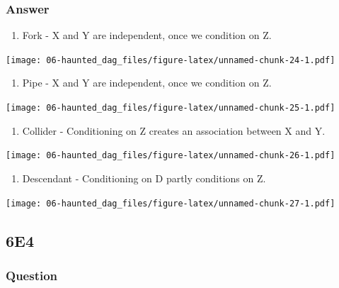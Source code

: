 \documentclass[
]{book}
\providecommand{\tightlist}{%
  \setlength{\itemsep}{0pt}\setlength{\parskip}{0pt}}
\begin{document}
\hypertarget{answer-50}{%
\subsubsection*{Answer}\label{answer-50}}

\begin{enumerate}
\def\labelenumi{\arabic{enumi}.}
\tightlist
\item
  Fork - X and Y are independent, once we condition on Z.
\end{enumerate}

\texttt{[image: 06-haunted\_dag\_files/figure-latex/unnamed-chunk-24-1.pdf]}

\begin{enumerate}
\def\labelenumi{\arabic{enumi}.}
\setcounter{enumi}{1}
\tightlist
\item
  Pipe - X and Y are independent, once we condition on Z.
\end{enumerate}

\texttt{[image: 06-haunted\_dag\_files/figure-latex/unnamed-chunk-25-1.pdf]}

\begin{enumerate}
\def\labelenumi{\arabic{enumi}.}
\setcounter{enumi}{2}
\tightlist
\item
  Collider - Conditioning on Z creates an association between X and Y.
\end{enumerate}

\texttt{[image: 06-haunted\_dag\_files/figure-latex/unnamed-chunk-26-1.pdf]}

\begin{enumerate}
\def\labelenumi{\arabic{enumi}.}
\setcounter{enumi}{3}
\tightlist
\item
  Descendant - Conditioning on D partly conditions on Z.
\end{enumerate}

\texttt{[image: 06-haunted\_dag\_files/figure-latex/unnamed-chunk-27-1.pdf]}

\hypertarget{e4-4}{%
\subsection*{6E4}\label{e4-4}}

\hypertarget{question-51}{%
\subsubsection*{Question}\label{question-51}}
\end{document}
